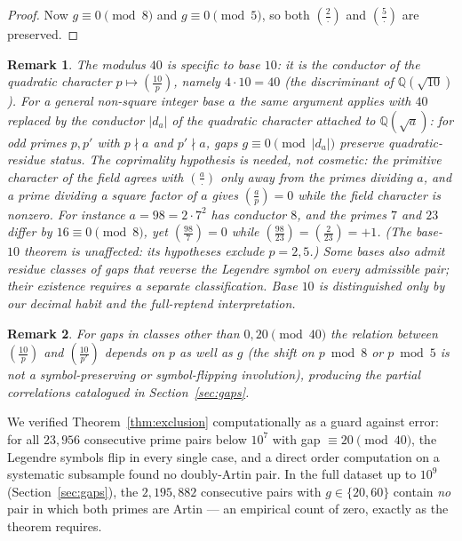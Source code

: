 \documentclass[11pt]{amsart}
\newtheorem{remark}{Remark}
\theoremstyle{definition}
\newcommand{\Lsym}[2]{\left(\tfrac{#1}{#2}\right)}
\begin{document}
\begin{proof}
	Now $g \equiv 0 \pmod 8$ and $g \equiv 0 \pmod 5$, so both
	$\Lsym{2}{\cdot}$ and $\Lsym{5}{\cdot}$ are preserved.
\end{proof}

\begin{remark}
	The modulus $40$ is specific to base $10$: it is the conductor of the
	quadratic character $p \mapsto \Lsym{10}{p}$, namely $4 \cdot 10 = 40$ (the
	discriminant of $\mathbb{Q}(\sqrt{10})$). For a general non-square integer base $a$
	the same argument applies with $40$ replaced by the conductor $|d_a|$ of the
	quadratic character attached to $\mathbb{Q}(\sqrt{a})$: for odd primes
	$p, p'$ with $p \nmid a$ and $p' \nmid a$, gaps
	$g \equiv 0 \pmod{|d_a|}$ preserve quadratic-residue status. The
	coprimality hypothesis is needed, not cosmetic: the primitive character of
	the field agrees with $\Lsym{a}{\cdot}$ only away from the primes dividing
	$a$, and a prime dividing a square factor of $a$ gives $\Lsym{a}{p} = 0$
	while the field character is nonzero. For instance $a = 98 = 2 \cdot 7^2$
	has conductor $8$, and the primes $7$ and $23$ differ by $16 \equiv 0
	\pmod 8$, yet $\Lsym{98}{7} = 0$ while $\Lsym{98}{23} = \Lsym{2}{23} = +1$.
	(The base-$10$ theorem is unaffected: its hypotheses exclude $p = 2, 5$.) Some bases also
	admit residue classes of gaps that reverse the Legendre symbol on every
	admissible pair; their existence requires a separate classification.
	Base $10$ is distinguished only by our decimal habit and the
	full-reptend interpretation.
\end{remark}

\begin{remark}
	For gaps in classes other than $0, 20 \pmod{40}$ the relation between
	$\Lsym{10}{p}$ and $\Lsym{10}{p'}$ depends on $p$ as well as $g$ (the shift on
	$p \bmod 8$ or $p \bmod 5$ is not a symbol-preserving or symbol-flipping
	involution), producing the partial correlations catalogued in
	Section~\ref{sec:gaps}.
\end{remark}

We verified Theorem~\ref{thm:exclusion} computationally as a guard against
error: for all $23{,}956$ consecutive prime pairs below $10^7$ with gap
$\equiv 20 \pmod{40}$, the Legendre symbols flip in every single case, and a
direct order computation on a systematic subsample found no doubly-Artin pair.
In the full dataset up to $10^9$ (Section~\ref{sec:gaps}), the
$2{,}195{,}882$ consecutive pairs with $g \in \{20, 60\}$ contain \emph{no}
pair in which both primes are Artin --- an empirical count of zero, exactly as
the theorem requires.
\end{document}
